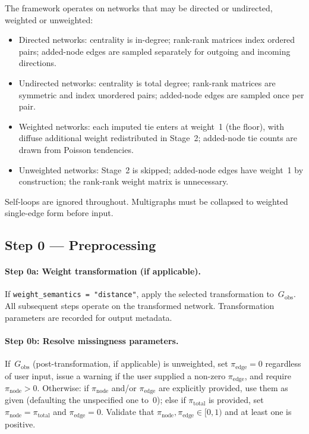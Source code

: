 \documentclass[11pt]{article}
\newcommand{\Gobs}{G_{\text{obs}}}
\newcommand{\pinode}{\pi_{\text{node}}}
\newcommand{\piedge}{\pi_{\text{edge}}}
\newcommand{\pitotal}{\pi_{\text{total}}}
\begin{document}
The framework operates on networks that may be directed or undirected, weighted or unweighted:
\begin{itemize}[leftmargin=*, itemsep=2pt]
  \item Directed networks: centrality is in-degree; rank-rank matrices index ordered pairs; added-node edges are sampled separately for outgoing and incoming directions.
  \item Undirected networks: centrality is total degree; rank-rank matrices are symmetric and index unordered pairs; added-node edges are sampled once per pair.
  \item Weighted networks: each imputed tie enters at weight~1 (the floor), with diffuse additional weight redistributed in Stage~2; added-node tie counts are drawn from Poisson tendencies.
  \item Unweighted networks: Stage~2 is skipped; added-node edges have weight~1 by construction; the rank-rank weight matrix is unnecessary.
\end{itemize}
Self-loops are ignored throughout. Multigraphs must be collapsed to weighted single-edge form before input.

\subsection{Step 0 --- Preprocessing}

\paragraph{Step 0a: Weight transformation (if applicable).}
If \texttt{weight\_semantics = "distance"}, apply the selected transformation to~$\Gobs$. All subsequent steps operate on the transformed network. Transformation parameters are recorded for output metadata.

\paragraph{Step 0b: Resolve missingness parameters.}
If~$\Gobs$ (post-transformation, if applicable) is unweighted, set $\piedge = 0$ regardless of user input, issue a warning if the user supplied a non-zero $\piedge$, and require $\pinode > 0$. Otherwise: if $\pinode$ and/or $\piedge$ are explicitly provided, use them as given (defaulting the unspecified one to~0); else if $\pitotal$ is provided, set $\pinode = \pitotal$ and $\piedge = 0$. Validate that $\pinode, \piedge \in [0, 1)$ and at least one is positive.
\end{document}
